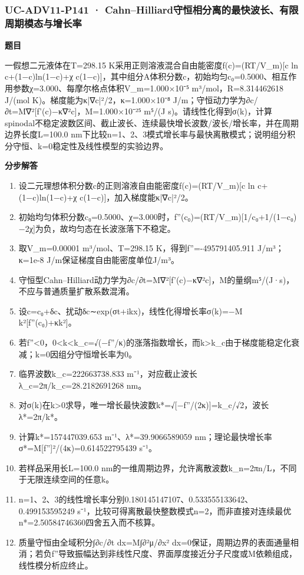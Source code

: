 \documentclass[UTF8,11pt,a4paper]{ctexart}
\begin{document}
\subsubsection*{UC-ADV11-P141 · Cahn–Hilliard守恒相分离的最快波长、有限周期模态与增长率}
\noindent\textbf{题目}\par
一假想二元液体在T=298.15 K采用正则溶液混合自由能密度f(c)=(RT/V\_m)[c ln c+(1−c)ln(1−c)+χ c(1−c)]，其中组分A体积分数c，初始均匀c₀=0.5000、相互作用参数χ=3.000、每摩尔格点体积V\_m=1.000×10⁻⁵ m³/mol，R=8.314462618 J/(mol K)。梯度能为κ|∇c|²/2，κ=1.000×10⁻⁸ J/m；守恒动力学为∂c/∂t=M∇²[f'(c)−κ∇²c]，M=1.000×10⁻²⁵ m⁵/(J s)。请线性化得到σ(k)，计算spinodal不稳定波数区间、截止波长、连续最快增长波数/波长/增长率，并在周期边界长度L=100.0 nm下比较n=1、2、3模式增长率与最快离散模式；说明组分积分守恒、k=0稳定性及线性模型的实验边界。\par
\medskip\noindent\textbf{分步解答}
\begin{enumerate}
\item 设二元理想体积分数c的正则溶液自由能密度f(c)=(RT/V\_m)[c ln c+(1−c)ln(1−c)+χ c(1−c)]，加入梯度能κ|∇c|²/2。
\item 初始均匀体积分数c₀=0.5000、χ=3.000时，f''(c₀)=(RT/V\_m)[1/c₀+1/(1−c₀)−2χ]为负，故均匀态在长波涨落下不稳定。
\item 取V\_m=0.00001 m³/mol、T=298.15 K，得到f''=-495791405.911 J/m³；κ=1e-8 J/m保证梯度自由能密度单位J/m³。
\item 守恒型Cahn–Hilliard动力学为∂c/∂t=M∇²[f'(c)−κ∇²c]，M的量纲m⁵/(J·s)，不应与普通质量扩散系数混淆。
\item 设c=c₀+δc、扰动δc∼exp(σt+ikx)，线性化得增长率σ(k)=−M k²[f''(c₀)+κk²]。
\item 若f''<0，0<k<k\_c=√(−f''/κ)的涨落指数增长，而k>k\_c由于梯度能稳定化衰减；k=0因组分守恒增长率为0。
\item 临界波数k\_c=222663738.833 m⁻¹，对应截止波长λ\_c=2π/k\_c=28.2182691268 nm。
\item 对σ(k)在k>0求导，唯一增长最快波数k*=√[−f''/(2κ)]=k\_c/√2，波长λ*=2π/k*。
\item 计算k*=157447039.653 m⁻¹、λ*=39.9066589059 nm；理论最快增长率σ*=M[f'']²/(4κ)=0.614522795439 s⁻¹。
\item 若样品采用长L=100.0 nm的一维周期边界，允许离散波数k\_n=2πn/L，不同于无限连续空间的任意k。
\item n=1、2、3的线性增长率分别0.180145147107、0.533555133642、0.499153595249 s⁻¹，比较可得离散最快整数模式n=2，而非直接对连续最优n*=2.50584746360四舍五入而不核算。
\item 质量守恒由全域积分∫∂c/∂t dx=M∫∂²μ/∂x² dx=0保证，周期边界的表面通量相消；若负f''导致振幅达到非线性尺度、界面厚度接近分子尺度或M依赖组成，线性模分析应终止。
\end{enumerate}
\end{document}
